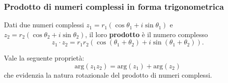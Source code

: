 \documentclass{book}
\begin{document}
\subsubsection{Prodotto di numeri complessi in forma trigonometrica}
\noindent\begin{minipage}{\textwidth}
    \begin{theorem}
        Dati due numeri complessi \( z_1 = r_1(\cos\theta_1 + i \sin\theta_1) \) e \( z_2 = r_2(\cos\theta_2 + i \sin\theta_2) \), il loro \textbf{prodotto} è il numero complesso
        \[ z_1 \cdot z_2 = r_1 r_2 (\cos(\theta_1 + \theta_2) + i \sin(\theta_1 + \theta_2)). \]
    \end{theorem}
\end{minipage}
\begin{proposition}
    Vale la seguente proprietà:
    \[\text{arg}\left(z_1 z_2\right) = \text{arg}\left(z_1\right) + \text{arg}\left(z_2\right)\]
    che evidenzia la natura rotazionale del prodotto di numeri complessi.
\end{proposition}
\end{document}

